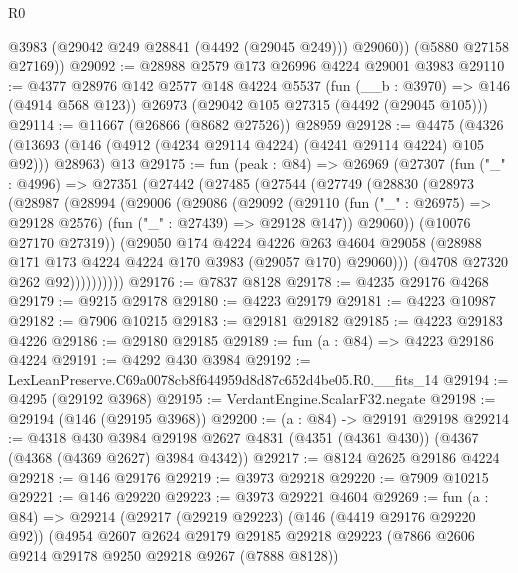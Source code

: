 \begin{lexlean}{R0}
\begin{coremodule}
          @3983
          (@29042 @249 @28841 (@4492 (@29045 @249)))
          @29060))
      (@5880 @27158 @27169))
@29092 := @28988 @2579 @173 @26996 @4224 @29001 @3983
@29110 := @4377
    @28976
    @142
    @2577
    @148
    @4224
    @5537
    (fun (__b : @3970) => @146 (@4914 @568 @123))
    @26973
    (@29042 @105 @27315 (@4492 (@29045 @105)))
@29114 := @11667 (@26866 (@8682 @27526)) @28959
@29128 := @4475
    (@4326 (@13693 (@146 (@4912 (@4234 @29114 @4224) (@4241 @29114 @4224) @105 @92))) @28963)
    @13
@29175 := fun (peak : @84) =>
  @26969
    (@27307
      (fun ("_" : @4996) =>
      @27351
        (@27442
          (@27485
            (@27544
              (@27749
                (@28830
                  (@28973
                    (@28987
                      (@28994
                        (@29006
                          (@29086
                            (@29092
                              (@29110
                                (fun ("_" : @26975) => @29128 @2576)
                                (fun ("_" : @27439) => @29128 @147))
                              @29060))
                          (@10076 @27170 @27319))
                        (@29050
                          @174
                          @4224
                          @4226
                          @263
                          @4604
                          @29058
                          (@28988 @171 @173 @4224 @4224 @170 @3983 (@29057 @170) @29060)))
                      (@4708 @27320 @262 @92))))))))))
@29176 := @7837 @8128
@29178 := @4235 @29176 @4268
@29179 := @9215 @29178
@29180 := @4223 @29179
@29181 := @4223 @10987
@29182 := @7906 @10215
@29183 := @29181 @29182
@29185 := @4223 @29183 @4226
@29186 := @29180 @29185
@29189 := fun (a : @84) => @4223 @29186 @4224
@29191 := @4292 @430 @3984
@29192 := LexLeanPreserve.C69a0078cb8f644959d8d87c652d4be05.R0.__fits_14
@29194 := @4295 (@29192 @3968)
@29195 := VerdantEngine.ScalarF32.negate
@29198 := @29194 (@146 (@29195 @3968))
@29200 := (a : @84) -> @29191 @29198
@29214 := @4318
    @430
    @3984
    @29198
    @2627
    @4831
    (@4351 (@4361 @430))
    (@4367 (@4368 (@4369 @2627) @3984 @4342))
@29217 := @8124 @2625 @29186 @4224
@29218 := @146 @29176
@29219 := @3973 @29218
@29220 := @7909 @10215
@29221 := @146 @29220
@29223 := @3973 @29221 @4604
@29269 := fun (a : @84) =>
  @29214
    (@29217
      (@29219 @29223)
      (@146 (@4419 @29176 @29220 @92))
      (@4954
        @2607
        @2624
        @29179
        @29185
        @29218
        @29223
        (@7866 @2606 @9214 @29178 @9250 @29218 @9267 (@7888 @8128))

\end{coremodule}
\end{lexlean}
